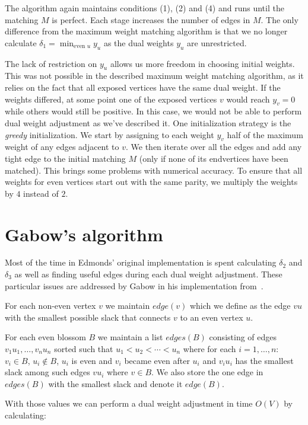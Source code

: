 The algorithm again maintains conditions (1), (2) and (4) and runs until the matching $M$ is perfect. Each stage increases the number of edges in $M$. The only difference from the maximum weight matching algorithm is that we no longer calculate $\delta_1 = \min_{\text{even } u} y_u$ as the dual weights $y_u$ are unrestricted.

The lack of restriction on $y_u$ allows us more freedom in choosing initial weights. This was not possible in the described maximum weight matching algorithm, as it relies on the fact that all exposed vertices have the same dual weight. If the weights differed, at some point one of the exposed vertices $v$ would reach $y_v = 0$ while others would still be positive. In this case, we would not be able to perform dual weight adjustment as we've described it. One initialization strategy is the \emph{greedy} initialization. We start by assigning to each weight $y_v$ half of the maximum weight of any edges adjacent to $v$. We then iterate over all the edges and add any tight edge to the initial matching $M$ (only if none of its endvertices have been matched). This brings some problems with numerical accuracy. To ensure that all weights for even vertices start out with the same parity, we multiply the weights by $4$ instead of $2$.

\section{Gabow's algorithm}

Most of the time in Edmonds' original implementation is spent calculating $\delta_2$ and $\delta_3$ as well as finding useful edges during each dual weight adjustment. These particular issues are addressed by Gabow in his implementation from~\cite{gabow1974implementation}.

For each non-even vertex $v$ we maintain $edge(v)$ which we define as the edge $vu$ with the smallest possible slack that connects $v$ to an even vertex $u$.

For each even blossom $B$ we maintain a list $edges(B)$ consisting of edges $v_1 u_1, \dots, v_n u_n$ sorted such that $u_1 < u_2 < \cdots < u_n$ where for each $i = 1, \dots, n$: $v_i \in B$, $u_i \notin B$, $u_i$ is even and $v_i$ became even after $u_i$ and $v_i u_i$ has the smallest slack among such edges $vu_i$ where $v \in B$. We also store the one edge in $edges(B)$ with the smallest slack and denote it $edge(B)$.

With those values we can perform a dual weight adjustment in time $O(V)$ by calculating:

